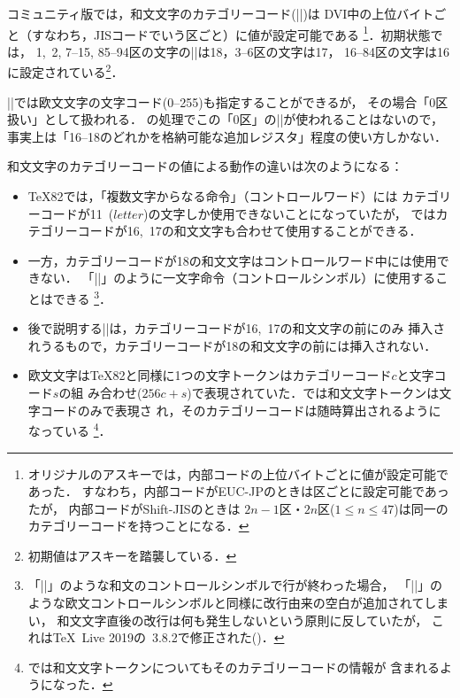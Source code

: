 \documentclass[a4paper,11pt,nomag,dvipdfmx]{jsarticle}
\begin{document}
\begin{cslist}
  \csitem[\.{kcatcode} <character code>=<16--18>]
  コミュニティ版\pTeX では，和文文字のカテゴリーコード(|\kcatcode|)は
  DVI中の上位バイトごと（すなわち，JISコードでいう区ごと）に値が設定可能である
  \footnote{%
    オリジナルのアスキー\pTeX では，内部コードの上位バイトごとに値が設定可能であった．
    すなわち，内部コードがEUC-JPのときは区ごとに設定可能であったが，
    内部コードがShift-JISのときは
    $2n-1$区・$2n$区($1\leq n\leq 47$)は同一のカテゴリーコードを持つことになる．
  }．初期状態では，
  1,~2, 7--15, 85--94区の文字の|\kcatcode|は18，3--6区の文字は17，
  16--84区の文字は16に設定されている\footnote{初期値はアスキー\pTeX を踏襲している．}．
\end{cslist}
\begin{dangerous}
  |\kcatcode|では欧文文字の文字コード(0--255)も指定することができるが，
  その場合「0区扱い」として扱われる．
  \pTeX の処理でこの「0区」の|\kcatcode|が使われることはないので，
  事実上は「16--18のどれかを格納可能な追加レジスタ」程度の使い方しかない．
\end{dangerous}

和文文字のカテゴリーコードの値による動作の違いは次のようになる：
\begin{itemize}
  \item \TeX82では，「複数文字からなる命令」（コントロールワード）には
    カテゴリーコードが11~($\mathit{letter}$)の文字しか使用できないことになっていたが，
    \pTeX ではカテゴリーコードが16,~17の和文文字も合わせて使用することができる．
  \item 一方，カテゴリーコードが18の和文文字はコントロールワード中には使用できない．
    「|\】|」のように一文字命令（コントロールシンボル）に使用することはできる
    \footnote{「|\】|」のような和文のコントロールシンボルで行が終わった場合，
    「|\!|」のような欧文コントロールシンボルと同様に改行由来の空白が追加されてしまい，
    和文文字直後の改行は何も発生しないという原則に反していたが，
    これは\TeX~Live 2019の\pTeX~3.8.2で修正された(\cite{tjb37})．}．
  \item 後で説明する|\jcharwidowpenalty|は，カテゴリーコードが16,~17の和文文字の前にのみ
    挿入されうるもので，カテゴリーコードが18の和文文字の前には挿入されない．
  \item 欧文文字は\TeX82と同様に1つの文字トークンはカテゴリーコード$c$と文字コード$s$の組
    み合わせ($256c+s$)で表現されていた．\pTeX では和文文字トークンは文字コードのみで表現さ
    れ，そのカテゴリーコードは随時算出されるようになっている
    \footnote{\upTeX では和文文字トークンについてもそのカテゴリーコードの情報が
    含まれるようになった．}．
\end{itemize}
\end{document}
